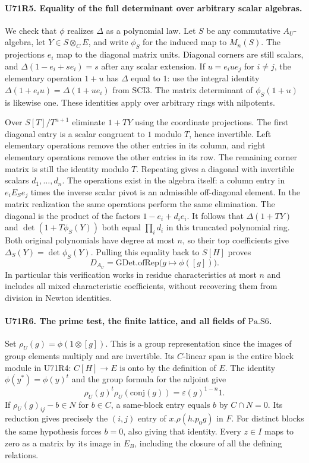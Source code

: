 \paragraph{U71R5. Equality of the full determinant over arbitrary scalar algebras.}
We check that $\phi$ realizes $\Delta$ as a polynomial law. Let
$S$ be any commutative $A_U$-algebra, let $Y\in S\otimes_C E$,
and write $\phi_S$ for the induced map to $M_n(S)$.
The projections $e_i$ map to the diagonal matrix units. Diagonal
corners are still scalars, and
$\Delta(1-e_i+s e_i)=s$ after any scalar extension.
If $u=e_iue_j$ for $i\ne j$, the elementary operation $1+u$
has $\Delta$ equal to $1$: use the integral identity
$\Delta(1+e_i u)=\Delta(1+u e_i)$ from SCI3.
The matrix determinant of $\phi_S(1+u)$ is likewise one.
These identities apply over arbitrary rings with nilpotents.

Over $S[T]/T^{n+1}$ eliminate $1+TY$ using the coordinate
projections. The first diagonal entry is a scalar congruent
to $1$ modulo $T$, hence invertible. Left elementary operations
remove the other entries in its column, and right elementary
operations remove the other entries in its row. The remaining
corner matrix is still the identity modulo $T$. Repeating
gives a diagonal with invertible scalars $d_1,\ldots,d_n$.
The operations exist in the algebra itself: a column entry
in $e_i E_S e_j$ times the inverse scalar pivot is an admissible
off-diagonal element. In the matrix realization the same
operations perform the same elimination.
The diagonal is the product of the factors $1-e_i+d_i e_i$.
It follows that $\Delta(1+TY)$ and
$\det(1+T\phi_S(Y))$ both equal $\prod_i d_i$ in this truncated
polynomial ring. Both original polynomials have degree at most
$n$, so their top coefficients give
$\Delta_S(Y)=\det\phi_S(Y)$. Pulling this equality back to
$S[H]$ proves
\[
             D_{A_U}=\mathrm{GDet.ofRep}\bigl(g\mapsto\phi([g])\bigr).
\]
In particular this verification works in residue characteristics
at most $n$ and includes all mixed characteristic coefficients,
without recovering them from division in Newton identities.

\paragraph{U71R6. The prime test, the finite lattice, and all fields of $\mathrm{Pa.S6}$.}
Set $\rho_U(g)=\phi(1\otimes[g])$. This is a group representation
since the images of group elements multiply and are invertible.
Its $C$-linear span is the entire block module in U71R4:
$C[H]\to E$ is onto by the definition of $E$.
The identity $\phi(y^*)=\phi(y)^t$ and the group formula for the
adjoint give
\[
       \rho_U(g)^t\rho_U(\mathrm{conj}(g))=\varepsilon(g)^{1-n}1.
\]
If $\rho_U(g)_{ij}-b\in N$ for $b\in C$, a same-block entry
equals $b$ by $C\cap N=0$. Its reduction gives precisely the
$(i,j)$ entry of $x.\rho(h.p_0g)$ in $F$. For distinct blocks
the same hypothesis forces $b=0$, also giving that identity.
Every $z\in I$ maps to zero as a matrix by its image in $E_B$,
including the closure of all the defining relations.

